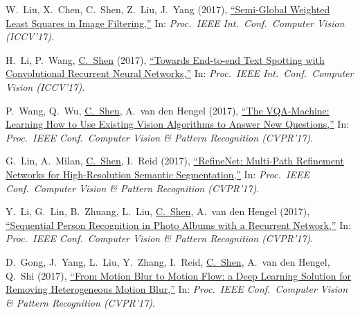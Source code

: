 \documentclass[9pt, a4paper]{article}
\newcommand{\years}[1]{\marginnote{\scriptsize #1}}
\def\highlight{\uline}
\begin{document}
\years{2017} W.~Liu, X.~Chen, C.~Shen, Z.~Liu, J.~Yang (2017),
\href{http://www.google.com/search?lr=&ie=UTF-8&oe=UTF-8&q=Semi-Global+Weighted+Least+Squares+in+Image+Filtering+Wei+Liu%2C+Xiaogang+Chen%2C+Chuanhua+Shen%2C+Zhi+Liu%2C+Jie+Yang}{``Semi-Global Weighted Least Squares in Image Filtering,{}''}
In: \emph{Proc.\ IEEE Int.\ Conf.\  Computer Vision (ICCV'17)}.

\medskip

\years{2017} H.~Li, P.~Wang, \highlight{C.~Shen} (2017),
\href{http://www.google.com/search?lr=&ie=UTF-8&oe=UTF-8&q=Towards+End-to-end+Text+Spotting+with+Convolutional+Recurrent+Neural+Networks+Hui+Li%2C+Peng+Wang%2C+Chunhua+Shen}{``Towards End-to-end Text Spotting with Convolutional Recurrent Neural Networks,{}''}
In: \emph{Proc.\ IEEE Int.\ Conf.\  Computer Vision (ICCV'17)}.

\medskip

\years{2017} P.~Wang, Q.~Wu, \highlight{C.~Shen}, A.~van den Hengel (2017),
\href{http://www.google.com/search?lr=&ie=UTF-8&oe=UTF-8&q=The+VQA-Machine%3A+Learning+How+to+Use+Existing+Vision+Algorithms+to+Answer+New+Questions+Peng+Wang%2C+Qi+Wu%2C+Chunhua+Shen%2C+Anton+van+den+Hengel}{``The {VQA}-Machine: Learning How to Use Existing Vision Algorithms to Answer New Questions,{}''}
In: \emph{Proc.\ IEEE Conf.\  Computer Vision \& Pattern Recognition (CVPR'17)}.

\medskip

\years{2017} G.~Lin, A.~Milan, \highlight{C.~Shen}, I.~Reid (2017),
\href{http://www.google.com/search?lr=&ie=UTF-8&oe=UTF-8&q=RefineNet%3A+Multi-Path+Refinement+Networks+for+High-Resolution+Semantic+Segmentation+Guosheng+Lin%2C+Anton+Milan%2C+Chunhua+Shen%2C+Ian+Reid}{``{RefineNet}: Multi-Path Refinement Networks for High-Resolution Semantic Segmentation,{}''}
In: \emph{Proc.\ IEEE Conf.\  Computer Vision \& Pattern Recognition (CVPR'17)}.

\medskip

\years{2017} Y.~Li, G.~Lin, B.~Zhuang, L.~Liu, \highlight{C.~Shen}, A.~van den Hengel (2017),
\href{http://www.google.com/search?lr=&ie=UTF-8&oe=UTF-8&q=Sequential+Person+Recognition+in+Photo+Albums+with+a+Recurrent+Network+Yao+Li%2C+Guosheng+Lin%2C+Bohan+Zhuang%2C+Lingqiao+Liu%2C+Chunhua+Shen%2C+Anton+van+den+Hengel}{``Sequential Person Recognition in Photo Albums with a Recurrent Network,{}''}
In: \emph{Proc.\ IEEE Conf.\  Computer Vision \& Pattern Recognition (CVPR'17)}.

\medskip

\years{2017} D.~Gong, J.~Yang, L.~Liu, Y.~Zhang, I.~Reid, \highlight{C.~Shen}, A.~van den Hengel, Q.~Shi (2017),
\href{http://www.google.com/search?lr=&ie=UTF-8&oe=UTF-8&q=From+Motion+Blur+to+Motion+Flow%3A+a+Deep+Learning+Solution+for+Removing+Heterogeneous+Motion+Blur+Dong+Gong%2C+Jie+Yang%2C+Lingqiao+Liu%2C+Yanning+Zhang%2C+Ian+Reid%2C+Chunhua+Shen%2C+Anton+van+den+Hengel%2C+Qinfeng+Shi}{``From Motion Blur to Motion Flow: a Deep Learning Solution for Removing Heterogeneous Motion Blur,{}''}
In: \emph{Proc.\ IEEE Conf.\  Computer Vision \& Pattern Recognition (CVPR'17)}.
\end{document}
